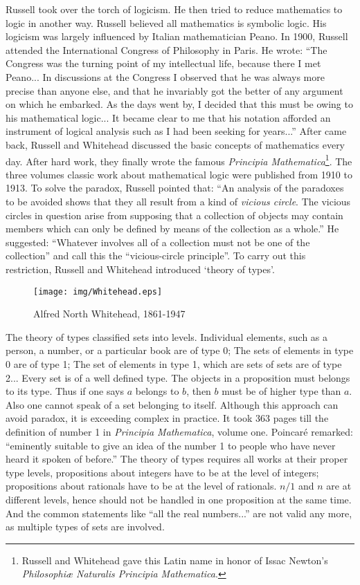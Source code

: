 \documentclass{article}
\begin{document}
Russell took over the torch of logicism. He then tried to reduce mathematics to logic in another way. Russell believed all mathematics is symbolic logic. His logicism was largely influenced by Italian mathematician Peano. In 1900, Russell attended the International Congress of Philosophy in Paris. He wrote: ``The Congress was the turning point of my intellectual life, because there I met Peano... In discussions at the Congress I observed that he was always more precise than anyone else, and that he invariably got the better of any argument on which he embarked. As the days went by, I decided that this must be owing to his mathematical logic... It became clear to me that his notation afforded an instrument of logical analysis such as I had been seeking for years...'' After came back, Russell and Whitehead discussed the basic concepts of mathematics every day. After hard work, they finally wrote the famous {\em Principia Mathematica}\footnote{Russell and Whitehead gave this Latin name in honor of Issac Newton's {\em Philosophiæ Naturalis Principia Mathematica}.}. The three volumes classic work about mathematical logic were published from 1910 to 1913. To solve the paradox, Russell pointed that: ``An analysis of the paradoxes to be avoided shows that they all result from a kind of {\em vicious circle}. The vicious circles in question arise from supposing that a collection of objects may contain members which can only be defined by means of the collection as a whole.'' He suggested: ``Whatever involves all of a collection must not be one of the collection'' and call this the ``vicious-circle principle''. To carry out this restriction, Russell and Whitehead introduced `theory of types'.

\begin{wrapfigure}{R}{0.4\textwidth}
 \centering
 \texttt{[image: img/Whitehead.eps]}
 \captionsetup{labelformat=empty}
 \caption{Alfred North Whitehead, 1861-1947}
 \label{fig:Whitehead}
\end{wrapfigure}

The theory of types classified sets into levels. Individual elements, such as a person, a number, or a particular book are of type 0; The sets of elements in type 0 are of type 1; The set of elements in type 1, which are sets of sets are of type 2... Every set is of a well defined type. The objects in a proposition must belongs to its type. Thus if one says $a$ belongs to $b$, then $b$ must be of higher type than $a$. Also one cannot speak of a set belonging to itself. Although this approach can avoid paradox, it is exceeding complex in practice. It took 363 pages till the definition of number 1 in {\em Principia Mathematica}, volume one. Poincaré remarked: ``eminently suitable to give an idea of the number 1 to people who have never heard it spoken of before.'' The theory of types requires all works at their proper type levels, propositions about integers have to be at the level of integers; propositions about rationals have to be at the level of rationals. $n/1$ and $n$ are at different levels, hence should not be handled in one proposition at the same time. And the common statements like ``all the real numbers...'' are not valid any more, as multiple types of sets are involved.
\end{document}

